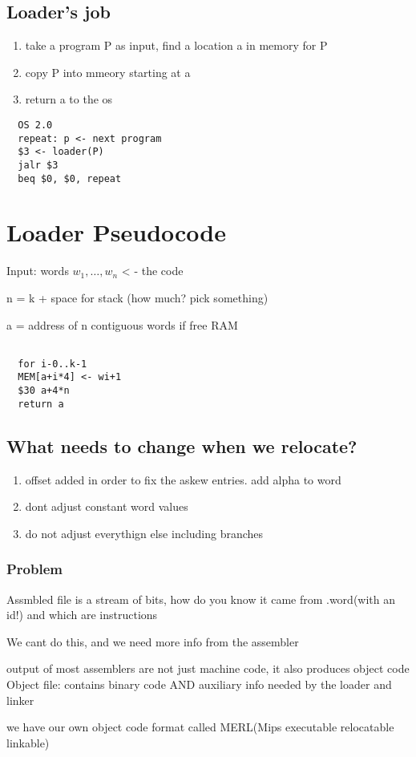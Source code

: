 \documentclass[11pt]{amsart}
\begin{document}
\subsection{Loader's job}
\begin{enumerate}
  \item take a program P as input, find a location a in memory for P
  \item copy P into mmeory starting at a
  \item return a to the os
\end{enumerate}
\begin{verbatim}
  OS 2.0
  repeat: p <- next program
  $3 <- loader(P)
  jalr $3
  beq $0, $0, repeat
\end{verbatim}
\section{Loader Pseudocode}
\par Input: words $w_1 , \dots, w_n$ < - the code
\par n = k + space for stack (how much? pick something)
\par a = address of n contiguous words if free RAM
\begin{verbatim}

  for i-0..k-1
  MEM[a+i*4] <- wi+1
  $30 a+4*n
  return a

\end{verbatim}
\subsection{What needs to change when we relocate?}
\begin{enumerate}
  \item offset added in order to  fix the askew entries. add alpha to word
  \item dont adjust constant word values
  \item do not adjust everythign else including branches
\end{enumerate}
\subsubsection{Problem}
\par Assmbled file is a stream of bits, how do you know it came from .word(with
an id!) and which are instructions
\par We cant do this, and we need more info from the assembler
\par output of most assemblers are not just machine code, it also produces
object code
Object file: contains binary code AND auxiliary info needed by the loader and
linker
\par we have our own object code format called MERL(Mips executable relocatable
linkable)
\end{document}
